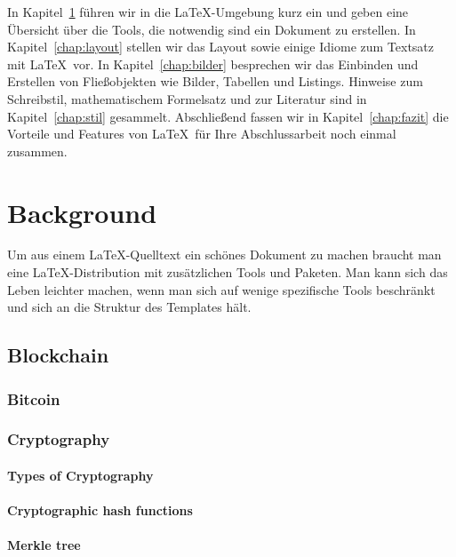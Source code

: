\documentclass[11pt,a4paper]{report}
\begin{document}
In Kapitel~\ref{ch:background} führen wir in die \LaTeX-Umgebung kurz ein und 
geben eine Übersicht über die Tools, die notwendig sind ein Dokument zu 
erstellen.
In Kapitel~\ref{chap:layout} stellen wir das Layout sowie einige Idiome 
zum Textsatz mit \LaTeX\ vor. 
In Kapitel~\ref{chap:bilder} besprechen wir das Einbinden und Erstellen 
von Fließobjekten wie Bilder, Tabellen und Listings.
Hinweise zum Schreibstil, mathematischem Formelsatz und zur Literatur sind 
in Kapitel~\ref{chap:stil} gesammelt.
Abschließend fassen wir in Kapitel~\ref{chap:fazit} die Vorteile und Features
von \LaTeX\ für Ihre Abschlussarbeit noch einmal zusammen.


\chapter{Background} \label{ch:background}

Um aus einem \LaTeX-Quelltext ein schönes Dokument zu machen braucht man 
eine \LaTeX-Distribution mit zusätzlichen Tools und Paketen. 
Man kann sich das Leben leichter machen, wenn man sich auf wenige spezifische
Tools beschränkt und sich an die Struktur des Templates hält.


\section{Blockchain} \label{}
\subsection{Bitcoin}
\subsection{Cryptography}
\subsubsection{Types of Cryptography}
\subsubsection{Cryptographic hash functions}
\subsubsection{Merkle tree}
\end{document}
